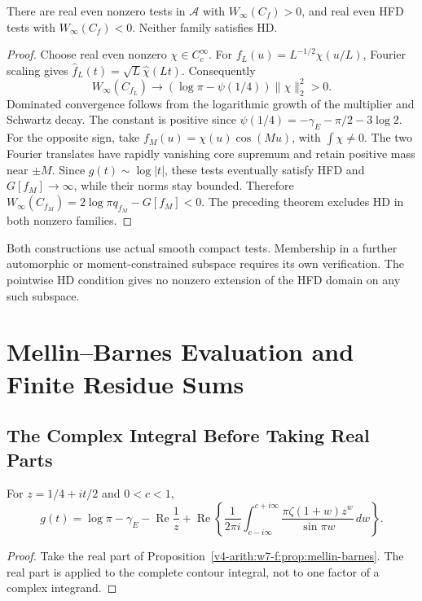 \begin{proposition}
\label{v4-arith:w7-f:prop:HD-vs-HFD}
There are real even nonzero tests in \(\mathscr A\) with
\(W_\infty(C_f)>0\), and real even HFD tests with
\(W_\infty(C_f)<0\). Neither family satisfies HD.
\end{proposition}
\begin{proof}
Choose real even nonzero \(\chi\in C_c^\infty\). For
\(f_L(u)=L^{-1/2}\chi(u/L)\), Fourier scaling gives
\(\widehat f_L(t)=\sqrt L\widehat\chi(Lt)\). Consequently
\[
 W_\infty(C_{f_L})\longrightarrow
 (\log\pi-\psi(1/4))\|\chi\|_2^2>0.
\]
Dominated convergence follows from the logarithmic growth of the
multiplier and Schwartz decay. The constant is positive since
\(\psi(1/4)=-\gamma_E-\pi/2-3\log2\).
For the opposite sign, take \(f_M(u)=\chi(u)\cos(Mu)\), with
\(\int\chi\ne0\). The two Fourier translates have rapidly vanishing
core supremum and retain positive mass near \(\pm M\). Since
\(g(t)\sim\log|t|\), these tests eventually satisfy HFD and
\(G[f_M]\to\infty\), while their norms stay bounded. Therefore
\(W_\infty(C_{f_M})=2\log\pi q_{f_M}-G[f_M]<0\).
The preceding theorem excludes HD in both nonzero families.
\end{proof}
\begin{remark}
\label{v4-arith:w7-f:rem:improvement-over-w6}
Both constructions use actual smooth compact tests. Membership in a
further automorphic or moment-constrained subspace requires its own
verification. The pointwise HD condition gives no nonzero extension
of the HFD domain on any such subspace.
\end{remark}

\section{Mellin--Barnes Evaluation and Finite Residue Sums}
\label{v4-arith:w7-f:mellin-barnes}
\subsection{The Complex Integral Before Taking Real Parts}
\label{v4-arith:w7-f:mellin-barnes:insertion}
\begin{lemma}
\label{v4-arith:w7-f:lem:g-mellin-barnes}
For \(z=1/4+it/2\) and \(0<c<1\),
\begin{equation}
\label{v4-arith:w7-f:eq:g-mellin-barnes}
 g(t)=\log\pi-\gamma_E-\operatorname{Re}\frac1z+
 \operatorname{Re}\left\{\frac1{2\pi i}\int_{c-i\infty}^{c+i\infty}
       \frac{\pi\zeta(1+w)z^w}{\sin\pi w}\,dw\right\}.
\end{equation}
\end{lemma}
\begin{proof}
Take the real part of Proposition~\ref{v4-arith:w7-f:prop:mellin-barnes}.
The real part is applied to the complete contour integral, not to
one factor of a complex integrand.
\end{proof}

